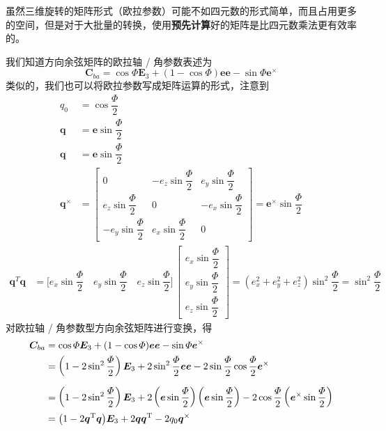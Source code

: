 虽然三维旋转的矩阵形式（欧拉参数）可能不如四元数的形式简单，而且占用更多的空间，但是对于大批量的转换，使用\textbf{预先计算}好的矩阵是比四元数乘法更有效率的。


我们知道方向余弦矩阵的欧拉轴 / 角参数表述为
\begin{equation}
	\bm{C}_{ba} = \cos \varPhi \bm{E}_3 +(1 - \cos \varPhi)\bm{e}\bm{e} - \sin \varPhi \bm{e}^\times
\end{equation}
类似的，我们也可以将欧拉参数写成矩阵运算的形式，注意到
\begin{align*}
	q_0 &= \cos \dfrac{\varPhi}{2}\\[0.5em]
	\bm{q} &= \bm{e} \sin \dfrac{\varPhi}{2} \\[0.5em]
	\bm{q} &= \bm{e} \sin \dfrac{\varPhi}{2} \\[0.5em]
	\bm{q}^{\times} &= 
	\begin{bmatrix}
		0 & -e_z\sin \dfrac{\varPhi}{2} & e_y\sin \dfrac{\varPhi}{2} \\[0.8em]
		e_z\sin \dfrac{\varPhi}{2} & 0 & -e_x\sin \dfrac{\varPhi}{2} \\[0.8em]
		-e_y\sin \dfrac{\varPhi}{2} & e_x\sin \dfrac{\varPhi}{2} & 0
	\end{bmatrix}
	= \bm{e}^\times \sin \dfrac{\varPhi}{2}
\end{align*}
\begin{align*}
	\bm{q}^T \bm{q} &= 
	\bigg[ e_x \sin \dfrac{\varPhi}{2} \quad e_y \sin \dfrac{\varPhi}{2} \quad e_z \sin  \dfrac{\varPhi}{2} \bigg]
	\,
	\begin{bmatrix}
		e_x \sin \dfrac{\varPhi}{2} \\[0.8em]
		 e_y \sin \dfrac{\varPhi}{2} \\[0.8em]
		 e_z \sin  \dfrac{\varPhi}{2}
	\end{bmatrix}
	= (e_x^2 +e_y^2 + e_z^2)\sin^2 \dfrac{\varPhi}{2} = \sin^2 \dfrac{\varPhi}{2}
\end{align*}
对欧拉轴 / 角参数型方向余弦矩阵进行变换，得
\begin{align}
	\bm{C}_{ba} &= \cos \varPhi \bm{E}_3 + (1 - \cos \varPhi)\bm{e}\bm{e} - \sin \varPhi \bm{e}^\times \notag \\
	&= \left( 1 - 2\sin^2 \dfrac{\varPhi}{2} \right) \bm{E}_3 + 2 \sin^2 \dfrac{\varPhi}{2} \bm{e}\bm{e} - 2 \sin \dfrac{\varPhi}{2} \cos \dfrac{\varPhi}{2} \bm{e}^\times \notag \\[0.5em]
	&= \left( 1 - 2\sin^2 \dfrac{\varPhi}{2}\right) \bm{E}_3 + 2\left( \bm{e} \sin \dfrac{\varPhi}{2}\right)\left( \bm{e} \sin \dfrac{\varPhi}{2}\right) - 2 \cos \dfrac{\varPhi}{2} \left( \bm{e}^\times \sin \dfrac{\varPhi}{2} \right) \notag \\
	& = \big( 1 - 2\bm{q}^{\text{T}} \bm{q} \big) \bm{E}_3 + 2 \bm{q}\bm{q}^{\text{T}} - 2 q_0 \bm{q}^\times 
\end{align}


